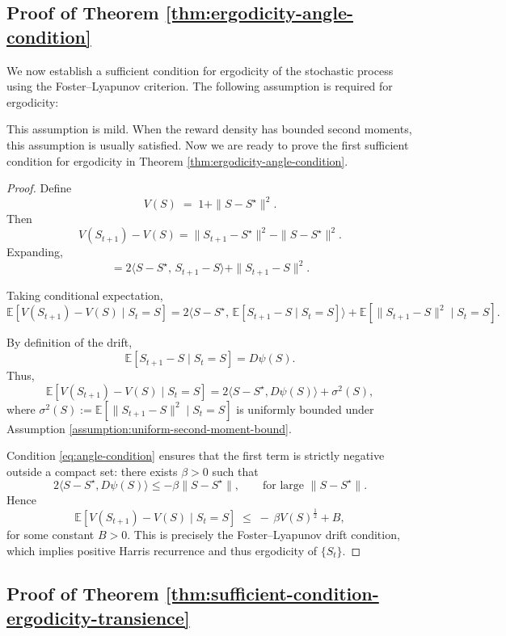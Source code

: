 \documentclass[12pt]{article}
\begin{document}
\subsection{Proof of Theorem \ref{thm:ergodicity-angle-condition}}
\label{app:D:ergodicity-angle-condition-proof}

We now establish a sufficient condition for ergodicity of the stochastic process using the Foster–Lyapunov criterion. The following assumption is required for ergodicity:


This assumption is mild. When the reward density has bounded second moments, this assumption is usually satisfied. Now we are ready to prove the first sufficient condition for ergodicity in Theorem \ref{thm:ergodicity-angle-condition}.

\begin{proof}
    Define
    \[
    V(S) \;=\; 1 + \|S - S^\star\|^2.
    \]
    Then
    \[
    V(S_{t+1}) - V(S) = \|S_{t+1}-S^\star\|^2 - \|S-S^\star\|^2.
    \]
    Expanding,
    \[
    = 2\langle S - S^\star,\, S_{t+1}-S\rangle + \|S_{t+1}-S\|^2.
    \]
    
    Taking conditional expectation,
    \[
    \mathbb{E}[V(S_{t+1})-V(S)\mid S_t=S]
    = 2\langle S - S^\star,\, \mathbb{E}[S_{t+1}-S \mid S_t=S]\rangle 
    + \mathbb{E}[\|S_{t+1}-S\|^2 \mid S_t=S].
    \]
    
    By definition of the drift, 
    \[
    \mathbb{E}[S_{t+1}-S \mid S_t=S] = D \psi(S).
    \]
    Thus,
    \[
    \mathbb{E}[V(S_{t+1})-V(S)\mid S_t=S]
    = 2 \langle S - S^\star, D \psi(S)\rangle + \sigma^2(S),
    \]
    where $\sigma^2(S):=\mathbb{E}[\|S_{t+1}-S\|^2\mid S_t=S]$ is uniformly bounded under Assumption \ref{assumption:uniform-second-moment-bound}.  
    
    Condition \eqref{eq:angle-condition} ensures that the first term is strictly negative outside a compact set: there exists $\beta>0$ such that
    \[
    2 \langle S - S^\star, D \psi(S)\rangle \le -\beta \|S-S^\star\|, \qquad  \text{for large } \|S-S^\star\|.
    \]
    Hence
    \[
    \mathbb{E}[V(S_{t+1})-V(S)\mid S_t=S]
    \;\le\; -\,\beta V(S)^{\frac{1}{2}} + B,
    \]
    for some constant $B>0$. This is precisely the Foster–Lyapunov drift condition, which implies positive Harris recurrence and thus ergodicity of $\{S_t\}$. 
    \end{proof}


\subsection{Proof of Theorem \ref{thm:sufficient-condition-ergodicity-transience}}
\label{app:D:sufficient-condition-ergodicity-transience-proof}
\end{document}
